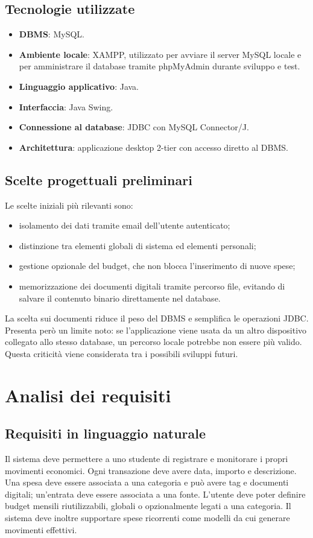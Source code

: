 \documentclass[11pt,a4paper]{article}
\begin{document}
\subsection{Tecnologie utilizzate}
\begin{itemize}
    \item \textbf{DBMS}: MySQL.
    \item \textbf{Ambiente locale}: XAMPP, utilizzato per avviare il server MySQL locale e per amministrare il database tramite phpMyAdmin durante sviluppo e test.
    \item \textbf{Linguaggio applicativo}: Java.
    \item \textbf{Interfaccia}: Java Swing.
    \item \textbf{Connessione al database}: JDBC con MySQL Connector/J.
    \item \textbf{Architettura}: applicazione desktop 2-tier con accesso diretto al DBMS.
\end{itemize}

\subsection{Scelte progettuali preliminari}
Le scelte iniziali più rilevanti sono:
\begin{itemize}
    \item isolamento dei dati tramite email dell'utente autenticato;
    \item distinzione tra elementi globali di sistema ed elementi personali;
    \item gestione opzionale del budget, che non blocca l'inserimento di nuove spese;
    \item memorizzazione dei documenti digitali tramite percorso file, evitando di salvare il contenuto binario direttamente nel database.
\end{itemize}
La scelta sui documenti riduce il peso del DBMS e semplifica le operazioni JDBC. Presenta però un limite noto: se l'applicazione viene usata da un altro dispositivo collegato allo stesso database, un percorso locale potrebbe non essere più valido. Questa criticità viene considerata tra i possibili sviluppi futuri.

\section{Analisi dei requisiti}
\subsection{Requisiti in linguaggio naturale}
Il sistema deve permettere a uno studente di registrare e monitorare i propri movimenti economici. Ogni transazione deve avere data, importo e descrizione. Una spesa deve essere associata a una categoria e può avere tag e documenti digitali; un'entrata deve essere associata a una fonte. L'utente deve poter definire budget mensili riutilizzabili, globali o opzionalmente legati a una categoria. Il sistema deve inoltre supportare spese ricorrenti come modelli da cui generare movimenti effettivi.
\end{document}
